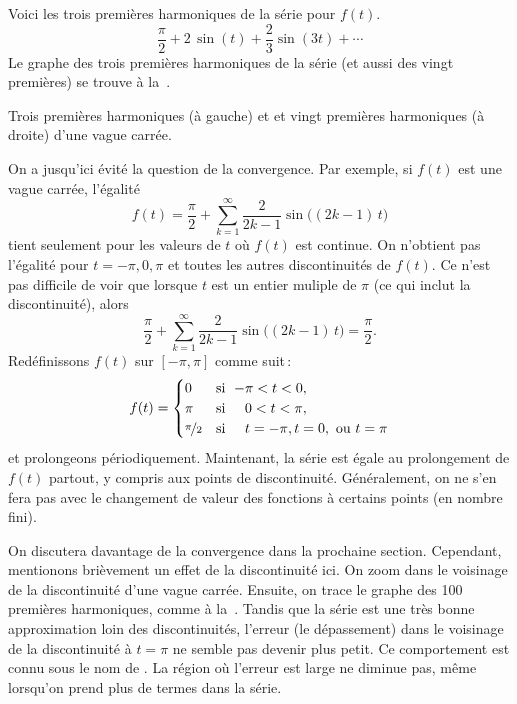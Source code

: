 \begin{example}
Voici les trois premières harmoniques de la série pour  $f(t)$.
\begin{equation*}
\frac{\pi}{2}
+
2 \, \sin (t)
+
\frac{2}{3}  \sin (3t)
+ \cdots
\end{equation*}
Le graphe des trois premières harmoniques de la série (et aussi des vingt premières) se trouve à la~.

\begin{myfig}
\capstart
\caption{Trois premières harmoniques (à gauche) et et vingt premières harmoniques (à droite) d'une vague carrée.\label{ts:squarewavefsfig}}
\end{myfig}
\end{example}

On a jusqu'ici évité la question de la convergence. Par exemple, si  $f(t)$ est une vague carrée, l'égalité 
\begin{equation*}
f(t) = 
\frac{\pi}{2} + \sum_{k=1}^\infty
\frac{2}{2k-1} 
\sin \bigl( (2k-1)\, t \bigr) 
\end{equation*}
tient seulement pour les valeurs de $t$ où $f(t)$ est continue. On n'obtient pas l'égalité pour $t=-\pi,0,\pi$ et toutes les autres discontinuités de $f(t)$. Ce n'est pas difficile de voir que lorsque $t$ est un entier muliple de 
$\pi$ (ce qui inclut la discontinuité), alors
\begin{equation*}
\frac{\pi}{2} + \sum_{k=1}^\infty
\frac{2}{2k-1} 
\sin \bigl( (2k-1)\, t \bigr) = \frac{\pi}{2} .
\end{equation*}
Redéfinissons $f(t)$ sur $[-\pi,\pi]$ comme suit\,: 
\begin{equation*}
f(t) =
\begin{cases}
0 & \text{si } \; {-\pi} < t < 0 , \\
\pi & \text{si } \; \phantom{-}0 < t < \pi , \\
\nicefrac{\pi}{2} & \text{si } \; \phantom{-}t = -\pi, 
t = 0,\text{ ou }
t = \pi 
\end{cases}
\end{equation*}
et prolongeons périodiquement.  Maintenant, la série est égale au prolongement de $f(t)$ partout, y compris aux points de discontinuité. Généralement, on ne s'en fera pas avec le changement de valeur des fonctions à certains points (en nombre fini). 

On discutera davantage de la convergence dans la prochaine section. Cependant, mentionons brièvement un effet de la discontinuité ici. On zoom dans le voisinage de la discontinuité d'une vague carrée. Ensuite, on trace le graphe des 100 premières harmoniques, comme à 
la~.  Tandis que la
série est une très bonne approximation loin des discontinuités, l'erreur
(le dépassement) dans le voisinage de la discontinuité à $t=\pi$ ne semble pas devenir plus petit. Ce comportement est connu sous le nom de \emph{}.
La région où l'erreur est large ne diminue pas, même lorsqu'on prend plus de termes dans la série. 

